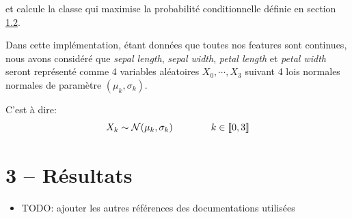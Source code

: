 \documentclass[
]{article}
\providecommand{\tightlist}{%
  \setlength{\itemsep}{0pt}\setlength{\parskip}{0pt}}
\begin{document}
et calcule la classe qui maximise la probabilité conditionnelle définie
en section \href{#naive-bayes}{1.2}.

Dans cette implémentation, étant données que toutes nos features sont
continues, nous avons considéré que \emph{sepal length}, \emph{sepal
width}, \emph{petal length} et \emph{petal width} seront représenté
comme 4 variables aléatoires \(X_0, \cdots, X_3\) suivant 4 lois
normales normales de paramètre \((\mu_k, \sigma_k)\).

C'est à dire: \[
X_k \sim \mathcal{N}( \mu_k, \sigma_k) \qquad \qquad k \in \llbracket{0, 3}\rrbracket
\]

\newpage{}

\hypertarget{ruxe9sultats-1}{%
\section{3 -- Résultats}\label{ruxe9sultats-1}}

\printbibliography[heading=bibintoc, title={Références}]

\begin{itemize}
\tightlist
\item
  TODO: ajouter les autres références des documentations utilisées
\end{itemize}
\end{document}
